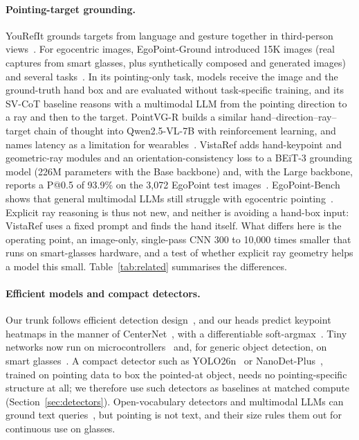 \paragraph{Pointing-target grounding.} YouRefIt grounds targets from language and gesture together in third-person views~\cite{chen2021yourefit}. For egocentric images, EgoPoint-Ground introduced 15K images (real captures from smart glasses, plus synthetically composed and generated images) and several tasks~\cite{egopoint}. In its pointing-only task, models receive the image and the ground-truth hand box and are evaluated without task-specific training, and its SV-CoT baseline reasons with a multimodal LLM from the pointing direction to a ray and then to the target. PointVG-R builds a similar hand--direction--ray--target chain of thought into Qwen2.5-VL-7B with reinforcement learning, and names latency as a limitation for wearables~\cite{li2026pointvgr}. VistaRef adds hand-keypoint and geometric-ray modules and an orientation-consistency loss to a BEiT-3 grounding model (226M parameters with the Base backbone) and, with the Large backbone, reports a P@0.5 of 93.9\% on the 3,072 EgoPoint test images~\cite{li2026vistaref}. EgoPoint-Bench shows that general multimodal LLMs still struggle with egocentric pointing~\cite{li2026egopointbench}. Explicit ray reasoning is thus not new, and neither is avoiding a hand-box input: VistaRef uses a fixed prompt and finds the hand itself. What differs here is the operating point, an image-only, single-pass CNN 300 to 10{,}000 times smaller that runs on smart-glasses hardware, and a test of whether explicit ray geometry helps a model this small. Table~\ref{tab:related} summarises the differences.

\paragraph{Efficient models and compact detectors.} Our trunk follows efficient detection design~\cite{ma2018shufflenet,tan2020efficientdet}, and our heads predict keypoint heatmaps in the manner of CenterNet~\cite{zhou2019objects}, with a differentiable soft-argmax~\cite{sun2018integral}. Tiny networks now run on microcontrollers~\cite{lin2020mcunet} and, for generic object detection, on smart glasses~\cite{moosmann2024tinyissimoyolo}. A compact detector such as YOLO26n~\cite{ultralytics2026yolo26} or NanoDet-Plus~\cite{rangilyu2021nanodet}, trained on pointing data to box the pointed-at object, needs no pointing-specific structure at all; we therefore use such detectors as baselines at matched compute (Section~\ref{sec:detectors}). Open-vocabulary detectors and multimodal LLMs can ground text queries~\cite{liu2024grounding,peng2023kosmos,you2024ferret,bai2025qwen25vl}, but pointing is not text, and their size rules them out for continuous use on glasses.

